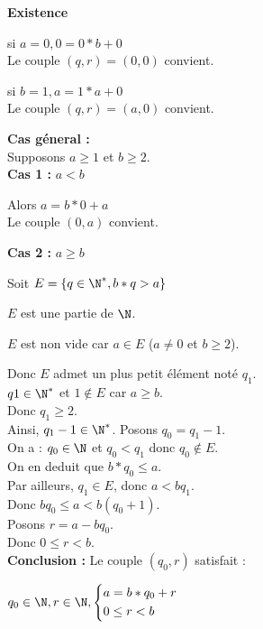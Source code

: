 \documentclass[12pt,twoside,a4paper]{article}
\begin{document}
	\begin{preuve}
		 \textbf{Existence}
		\begin{tab}
			\begin{liste}
				\item si $a=0,0=0*b+0$ \\
					Le couple $(q,r)=(0,0)$ convient.
				\item si $b=1,a=1*a+0$ \\
					Le couple $(q,r)=(a,0)$ convient.
				\item \textbf{Cas g\'eneral :} \\
					Supposons $a\geq 1$ et $b\geq 2$. \\
					\textbf{Cas 1 :} $a<b$
					\begin{tab}
						Alors $a=b*0+a$ \\
						Le couple $(0,a)$ convient.
					\end{tab}
					\textbf{Cas 2 :} $a\geq b$
					\begin{tab}
						Soit $E=\left\{q\in\N^*,b*q>a\right\}$
						\begin{liste}
							\item $E$ est une partie de $\N$.
							\item $E$ est non vide car $a\in E$ ($a\neq 0$ et $b\geq 2$).
						\end{liste}
						Donc $E$ admet un plus petit \'el\'ement not\'e $q_1$. \\
						$q1\in\N^*$ et $1\notin E$ car $a\geq b$. \\
						Donc $q_1\geq 2$. \\
						Ainsi, $q_1-1\in\N^*$. Posons $q_0=q_1-1$. \\
						On a : $q_0\in\N$ et $q_0<q_1$ donc $q_0\notin E$. \\
						On en deduit que $b*q_0\leq a$. \\
						Par ailleurs, $q_1\in E$, donc $a<bq_1$. \\
						Donc $bq_0\leq a<b(q_0+1)$. \\
						Posons $r=a-bq_0$. \\
						Donc $0\leq r<b$. \\
						\textbf{Conclusion :} Le couple $(q_0,r)$ satisfait : \\
						\begin{tab}
							$q_0\in\N,r\in\N,\left\{\begin{aligned}&a=b*q_0+r\\
																   &0\leq r<b\end{aligned}\right.$

\end{tab}
\end{tab}
\end{liste}
\end{tab}
\end{preuve}
\end{document}
